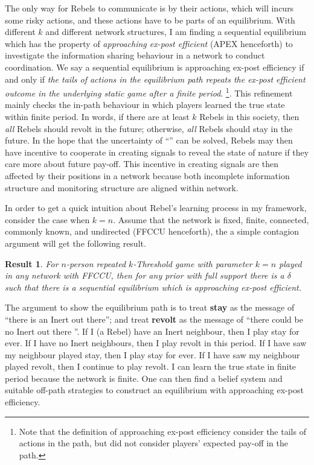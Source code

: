 \documentclass[12pt,letter]{article}
\newtheorem{result}{Result}
\theoremstyle{definition}
\theoremstyle{remark}
\theoremstyle{claim}
\begin{document}
The only way for Rebels to communicate is by their actions, which will incurs some risky actions, and these actions have to be parts of an equilibrium. With different $k$ and different network structures, I am finding a sequential equilibrium which has the property of \textit{approaching ex-post efficient} (APEX henceforth) to investigate the information sharing behaviour in a network to conduct coordination. We say a sequential equilibrium is approaching ex-post efficiency if and only if \textit{the tails of actions in the equilibrium path repeats the ex-post efficient outcome in the underlying static game after a finite period}. \footnote{Note that the definition of approaching ex-post efficiency consider the tails of actions in the path, but did not consider players' expected pay-off in the path.}. This refinement mainly checks the in-path behaviour in which players learned the true state within finite period. In words, if there are at least $k$ Rebels in this society, then \textit{all} Rebels should revolt in the future; otherwise, \textit{all} Rebels should stay in the future. In the hope that the uncertainty of ``'' can be solved, Rebels may then have incentive to cooperate in creating signals to reveal the state of nature if they care more about future pay-off. This incentive in creating signals are then affected by their positions in a network because both incomplete information structure and monitoring structure are aligned within network.

In order to get a quick intuition about Rebel's learning process in my framework, consider the case when $k=n$. Assume that the network is fixed, finite, connected, commonly known, and undirected (FFCCU henceforth), the a simple contagion argument will get the following result.
\begin{result}
For $n$-person repeated $k$-Threshold game with parameter $k=n$ played in any network with FFCCU, then for any prior with full support there is a $\delta$ such that there is a sequential equilibrium which is approaching ex-post efficient.
\end{result}

The argument to show the equilibrium path is to treat \textbf{stay} as the message of ``there is an Inert out there''; and treat \textbf{revolt} as the message of ``there could be no Inert out there ''. If I (a Rebel) have an Inert neighbour, then I play stay for ever. If I have no Inert neighbours, then I play revolt in this period. If I have saw my neighbour played stay, then I play stay for ever. If I have saw my neighbour played revolt, then I continue to play revolt. I can learn the true state in finite period because the network is finite. One can then find a belief system and suitable off-path strategies to construct an equilibrium with approaching ex-post efficiency. 
\end{document}

